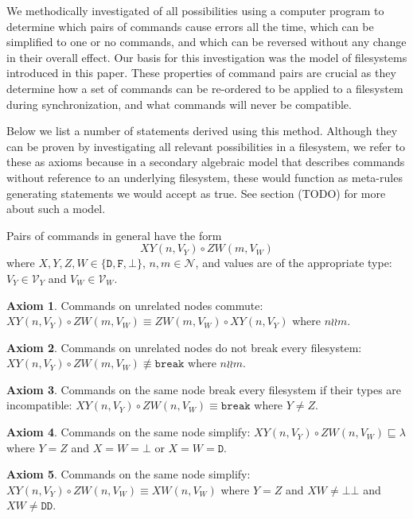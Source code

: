 \documentclass[12pt]{article}
\newcommand{\setvx}[1]{\mathcal{V}_{#1}}
\newcommand{\setn}{\mathcal{N}} %
\newcommand{\empt}{\bot}
\newcommand{\cbrk}{\mathtt{break}} %
\newcommand{\fscommand}[2]{{#1#2}}
\newcommand{\fsregcommandchar}[1]{\mathtt{#1}}
\newcommand{\fsregcommand}[2]{\fscommand{\fsregcommandchar{#1}}{\fsregcommandchar{#2}}}
\newcommand{\cbb}{\fsregcommand{\empt}{\empt}}
\newcommand{\cdd}{\fsregcommand{D}{D}}
\newcommand{\cxy}{\fscommand{X}{Y}}
\newcommand{\cxw}{\fscommand{X}{W}}
\newcommand{\czw}{\fscommand{Z}{W}}
\newcommand{\typeset}{\{\fsregcommandchar{D},\fsregcommandchar{F},\empt\}} %
\newcommand{\cc}{\circ} %
\newcommand{\eqext}{\sqsubseteq} %
\newcommand{\nequiv}{\not\equiv}
\newcommand{\indep}{\mathrel{\wr\wr}} %
\newcommand{\unrel}{\indep} %
\newcommand{\emptyseq}{\lambda} %
\theoremstyle{definition}
\newtheorem{myax}{Axiom}
\begin{document}
We methodically investigated of all possibilities using a computer program
to determine
which pairs of commands cause errors all the time,
which can be simplified to one or no commands, and which can be reversed
without any change in their overall effect.
Our basis for this investigation was the model of filesystems introduced in this paper.
These properties of command pairs are crucial as they determine
how a set of commands can be re-ordered to be applied to a filesystem
during synchronization, and what commands will never be compatible.

Below we list a number of statements derived using this method.
Although they can be proven by investigating all relevant possibilities
in a filesystem, we refer to these as axioms because in a secondary algebraic model
that describes commands without reference to an underlying filesystem,
these would function as meta-rules generating statements we would accept as true.
See section (TODO) for more about such a model.

\medskip

Pairs of commands in general have the form
\[ \cxy(n,V_Y)\cc  \czw(m,V_W) \]
where $X,Y,Z,W\in\typeset$, $n,m\in\setn$, 
and values are of the appropriate type: 
$V_Y\in\setvx{Y}$ and $V_W\in\setvx{W}$.

\begin{myax}\label{ax_separate_commute}
Commands on unrelated nodes commute:
$\cxy(n,V_Y)\cc \czw(m,V_W) \equiv \czw(m,V_W)\cc \cxy(n,V_Y)$ where $n\unrel m$.
\end{myax}

\begin{myax}\label{ax_separate_nobreaks}
Commands on unrelated nodes do not break every filesystem:
$\cxy(n,V_Y)\cc \czw(m,V_W) \nequiv \cbrk$ where $n\unrel m$.
\end{myax}

\begin{myax}\label{ax_same_breaks}
Commands on the same node break every filesystem if their types are incompatible:
$\cxy(n,V_Y)\cc \czw(n,V_W) \equiv \cbrk$ where $Y\ne Z$.
\end{myax}

\begin{myax}\label{ax_same_emptyseq}
Commands on the same node simplify:
$\cxy(n,V_Y)\cc \czw(n,V_W) \eqext \emptyseq$ where $Y=Z$ and $X=W=\fsregcommandchar{\empt}$ 
or $X=W=\fsregcommandchar{D}$.
\end{myax}

\begin{myax}\label{ax_same_singlec}
Commands on the same node simplify:
$\cxy(n,V_Y)\cc  \czw(n,V_W) \equiv \cxw(n,V_W)$ where $Y=Z$ and $XW\neq\cbb$ and $XW\neq\cdd$.
\end{myax}
\end{document}
